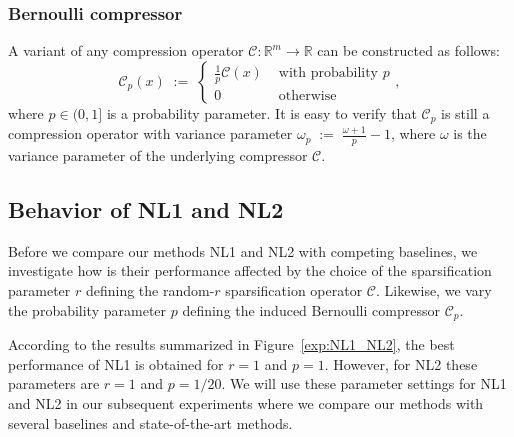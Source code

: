 \documentclass[10pt]{article}
\newcommand{\eqdef}{\; { := }\;}
\newcommand{\R}{\mathbb{R}}
\newcommand{\cC}{{\mathcal{C}}}
\begin{document}
\subsubsection{Bernoulli compressor} \label{sec:Bernoulli}
A variant of any compression operator $\cC:\R^m \to \R$ can be constructed as follows:
\begin{equation}\label{eq:Qp}
	\cC_p(x) \eqdef \left\{ \begin{array}{rl}
		\frac{1}{p}\cC(x) & \mbox{ with probability $p$} \\
		0 &\mbox{ otherwise}
	\end{array}, \right.
\end{equation}
where $p\in (0, 1]$ is a probability parameter. It is easy to verify that $\cC_p$ is still a compression operator with variance parameter $\omega_p \eqdef \frac{\omega+1}{p} - 1$, where $\omega$ is the variance parameter of the underlying compressor $\cC$.


\subsection{Behavior of {\sf NL1} and {\sf NL2}}

Before we compare our methods {\sf NL1} and {\sf NL2} with competing baselines,  we investigate how is their performance affected by the choice of the  sparsification parameter $r$ defining the random-$r$ sparsification operator  $\cC$. Likewise, we vary the probability parameter $p$ defining the induced Bernoulli compressor  $\cC_p$.


According to the results summarized in  Figure~\ref{exp:NL1_NL2}, the best performance of {\sf NL1} is obtained for $r=1$ and $p=1$. However, for {\sf NL2} these parameters are $r=1$ and $p=1/20$. We will use these  parameter settings for {\sf NL1} and {\sf NL2} in our subsequent experiments where we compare our methods with several baselines and state-of-the-art methods.
\end{document}

